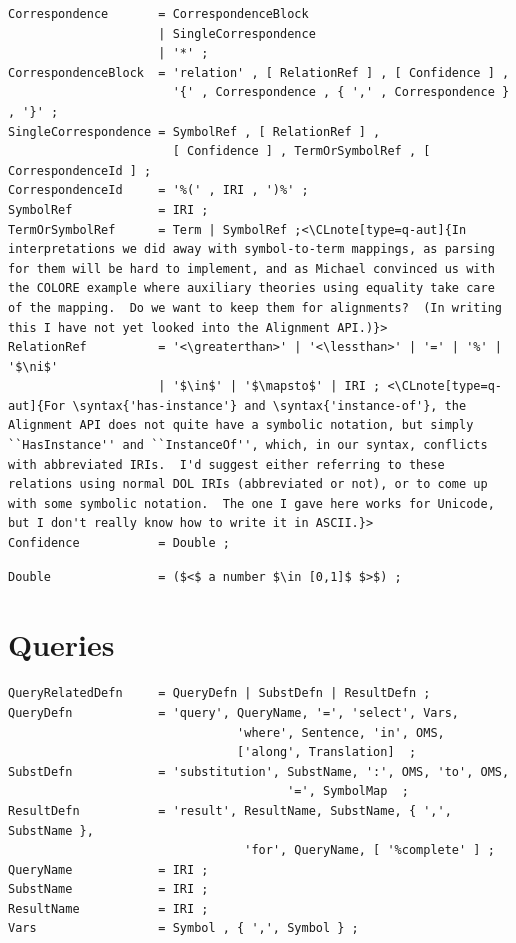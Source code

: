 \documentclass[10pt,%
\ifpretendfinal
final%
\else
draft%
\fi,
]{scrreprt}
\makeatletter
\newcommand*\CommentAuthor{}
\renewcommand*\CommentAuthor{#1}}
\newcommand*\CommentDate{}
\renewcommand*\CommentDate{#1}}
\newcommand*\CommentId{}
\renewcommand*\CommentId{#1}}
\newcommand*\CommentType{}
\renewcommand*\CommentType{#1}}
\newcommand*{\SetCommentColorByType}[1]{%
\edef\localType{{#1}}%
\expandafter\ifstrequal\localType{q-aut}{\colorlet{CommentColor}{red}}{%
\expandafter\ifstrequal\localType{q-all}{\colorlet{CommentColor}{orange}}{%
\expandafter\ifstrequal\localType{todo}{\colorlet{CommentColor}{orange}}{%
\expandafter\ifstrequal\localType{fyi}{\colorlet{CommentColor}{lightgray}}{%
\colorlet{CommentColor}{yellow}}}}}}
\newcommand*{\SetCommentPrefixByType}[1]{%
\edef\localType{{#1}}%
\expandafter\@ifmtarg\localType{%
\edef\CommentPrefix{}%
}{%
\caseupper[q]{#1}%
\edef\CommentPrefix{\thestring: }%
}}
\newcommand*{\initComment}[1]{%
\setkeys{Comment}{#1}%
\SetCommentColorByType{\CommentType}%
\relax%
\SetCommentPrefixByType{\CommentType}%
\relax%
}
\newcommand*{\todonote}[2][]{%
\initComment{#1}%
\pdfcomment[author=\CommentAuthor,color=CommentColor,date=\CommentDate,id=\CommentId]{%
\CommentPrefix
#2}}
\renewcommand*{\todonote}[2][]{%
\initComment{#1}%
\ednote{\CommentPrefix #2}}
\newcommand*{\CLnote}[2][author=Christoph Lange]{%
\todonote[author=Christoph Lange,#1]{#2} 
}
\newcommand*{\syntax}[1]{\texttt{#1}}
\newcommand{\sclause}[1]{\section{#1}}
\newcommand{\red}[1]{{\color{red}{#1}}}
\makeatother
\begin{document}
\begin{lstlisting}[language=ebnf,escapeinside={<>},mathescape]
Correspondence       = CorrespondenceBlock
                     | SingleCorrespondence
                     | '*' ;
CorrespondenceBlock  = 'relation' , [ RelationRef ] , [ Confidence ] , 
                       '{' , Correspondence , { ',' , Correspondence } , '}' ;
SingleCorrespondence = SymbolRef , [ RelationRef ] ,
                       [ Confidence ] , TermOrSymbolRef , [ CorrespondenceId ] ;
CorrespondenceId     = '%(' , IRI , ')%' ;
SymbolRef            = IRI ;
TermOrSymbolRef      = Term | SymbolRef ;<\CLnote[type=q-aut]{In interpretations we did away with symbol-to-term mappings, as parsing for them will be hard to implement, and as Michael convinced us with the COLORE example where auxiliary theories using equality take care of the mapping.  Do we want to keep them for alignments?  (In writing this I have not yet looked into the Alignment API.)}>
RelationRef          = '<\greaterthan>' | '<\lessthan>' | '=' | '%' | '$\ni$' 
                     | '$\in$' | '$\mapsto$' | IRI ; <\CLnote[type=q-aut]{For \syntax{'has-instance'} and \syntax{'instance-of'}, the Alignment API does not quite have a symbolic notation, but simply ``HasInstance'' and ``InstanceOf'', which, in our syntax, conflicts with abbreviated IRIs.  I'd suggest either referring to these relations using normal DOL IRIs (abbreviated or not), or to come up with some symbolic notation.  The one I gave here works for Unicode, but I don't really know how to write it in ASCII.}>
Confidence           = Double ; 
\end{lstlisting}
\begin{lstlisting}[language=ebnf,escapeinside={()}]
Double               = ($<$ a number $\in [0,1]$ $>$) ;
\end{lstlisting}

\sclause{Queries}
\red{new!!!!!!!!!!!!!!!!!!!!!!!!!!!!!!!!!!!!!!!!!!}
\begin{lstlisting}[language=ebnf,escapeinside={<>},mathescape]
QueryRelatedDefn     = QueryDefn | SubstDefn | ResultDefn ;
QueryDefn            = 'query', QueryName, '=', 'select', Vars, 
                                'where', Sentence, 'in', OMS, 
                                ['along', Translation]  ;
SubstDefn            = 'substitution', SubstName, ':', OMS, 'to', OMS, 
                                       '=', SymbolMap  ;
ResultDefn           = 'result', ResultName, SubstName, { ',', SubstName },
                                 'for', QueryName, [ '%complete' ] ;
QueryName            = IRI ;
SubstName            = IRI ;
ResultName           = IRI ;
Vars                 = Symbol , { ',', Symbol } ;
\end{lstlisting}
\end{document}
